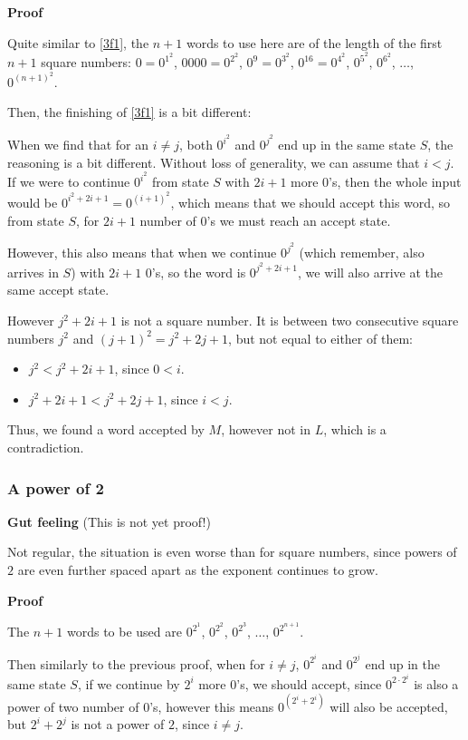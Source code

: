 \textbf{Proof}

 Quite similar to \ref{3f1}, the $n+1$ words to use here are of the length of the first $n+1$ square numbers: $0 = 0^{1^2}$, $0000 = 0^{2^2}$, $0^9 = 0^{3^2}$, $0^{16} = 0^{4^2}$, $0^{5^2}$, $0^{6^2}$, $\dots$, $0^{(n+1)^2}$.
 
Then, the finishing of \ref{3f1} is a bit different:

When we find that for an $i\neq{}j$, both $0^{i^2}$ and $0^{j^2}$ end up in the same state $S$, the reasoning is a bit different. Without loss of generality, we can assume that $i<j$. If we were to continue $0^{i^2}$ from state $S$ with $2i+1$ more $0$'s, then the whole input would be $0^{i^2+2i+1} = 0^{(i+1)^2}$, which means that we should accept this word, so from state $S$, for $2i+1$ number of $0$'s we must reach an accept state.

However, this also means that when we continue $0^{j^2}$ (which remember, also arrives in $S$) with $2i+1$ $0$'s, so the word is $0^{j^2+2i+1}$, we will also arrive at the same accept state.

However $j^2+2i+1$ is not a square number. It is between two consecutive square numbers $j^2$ and $(j+1)^2 = j^2+2j+1$, but not equal to either of them:
\begin{itemize}
    \item $j^2 < j^2 + 2i + 1$, since $0<i$.
    \item $j^2 + 2i + 1 < j^2 + 2j + 1$, since $i<j$.
\end{itemize}

Thus, we found a word accepted by $M$, however not in $L$, which is a contradiction.

\subsubsection{A power of 2}

\textbf{Gut feeling} (This is not yet proof!)

Not regular, the situation is even worse than for square numbers, since powers of $2$ are even further spaced apart as the exponent continues to grow.

\textbf{Proof}

The $n+1$ words to be used are $0^{2^1}$, $0^{2^2}$, $0^{2^3}$, $\dots$, $0^{2^{n+1}}$.

Then similarly to the previous proof, when for $i\neq{}j$, $0^{2^i}$ and $0^{2^j}$ end up in the same state $S$, if we continue by $2^i$ more $0$'s, we should accept, since $0^{2\cdot{}2^i}$ is also a power of two number of $0$'s, however this means  $0^{(2^i + 2^i)}$ will also be accepted, but $2^i + 2^j$ is not a power of $2$, since $i\neq{}j$.